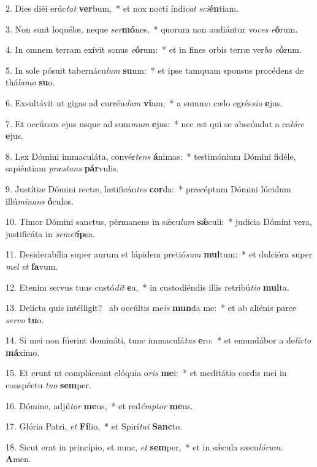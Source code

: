 2. Dies diéi erúc\textit{tat} \textbf{ver}bum,~*  et nox nocti índi\textit{cat} \textit{sci}\textbf{én}tiam.\

3. Non sunt loquélæ, neque \textit{ser}\textbf{mó}nes,~*  quorum non audiántur vo\textit{ces} \textit{e}\textbf{ó}rum.\

4. In omnem terram exívit sonus \textit{e}\textbf{ó}rum:~*  et in fines orbis terræ ver\textit{ba} \textit{e}\textbf{ó}rum.\

5. In sole pósuit tabernácu\textit{lum} \textbf{su}um:~*  et ipse tamquam sponsus procédens de thá\textit{la}\textit{mo} \textbf{su}o.\

6. Exsultávit ut gigas ad currén\textit{dam} \textbf{vi}am,~*  a summo cælo egrés\textit{si}\textit{o} \textbf{e}jus.\

7. Et occúrsus ejus usque ad sum\textit{mum} \textbf{e}jus:~*  nec est qui se abscóndat a ca\textit{ló}\textit{re} \textbf{e}jus.\

8. Lex Dómini immaculáta, convér\textit{tens} \textbf{á}nimas:~*  testimónium Dómini fidéle, sapiéntiam \textit{præ}\textit{stans} \textbf{pár}vulis.\

9. Justítiæ Dómini rectæ, lætificán\textit{tes} \textbf{cor}da:~*  præcéptum Dómini lúcidum illú\textit{mi}\textit{nans} \textbf{ó}culos.\

10. Timor Dómini sanctus, pérmanens in sǽcu\textit{lum} \textbf{sǽ}culi:~*  judícia Dómini vera, justificáta in \textit{se}\textit{met}\textbf{íp}sa.\

11. Desiderabília super aurum et lápidem pretió\textit{sum} \textbf{mul}tum:~*  et dulcióra super \textit{mel} \textit{et} \textbf{fa}vum.\

12. Etenim servus tuus custó\textit{dit} \textbf{e}a,~*  in custodiéndis illis retribú\textit{ti}\textit{o} \textbf{mul}ta.\

13. Delícta quis intélligit? \dag\  ab occúltis me\textit{is} \textbf{mun}da me:~*  et ab aliénis parce \textit{ser}\textit{vo} \textbf{tu}o.\

14. Si mei non fúerint domináti, tunc immaculá\textit{tus} \textbf{e}ro:~*  et emundábor a de\textit{líc}\textit{to} \textbf{má}ximo.\

15. Et erunt ut compláceant elóquia o\textit{ris} \textbf{me}i:~*  et meditátio cordis mei in conspéctu \textit{tu}\textit{o} \textbf{sem}per.\

16. Dómine, adjú\textit{tor} \textbf{me}us,~*  et red\textit{émp}\textit{tor} \textbf{me}us.\

17. Glória Patri, \textit{et} \textbf{Fí}lio,~*  et Spirí\textit{tu}\textit{i} \textbf{Sanc}to.\

18. Sicut erat in princípio, et nunc, \textit{et} \textbf{sem}per,~*  et in sǽcula sæcu\textit{ló}\textit{rum}. \textbf{A}men.\


